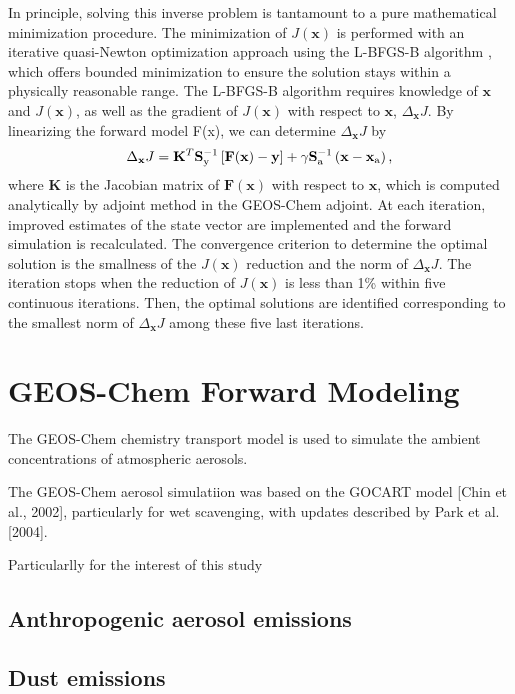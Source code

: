  In principle, solving this inverse problem is tantamount to a pure
 mathematical minimization procedure. The minimization of $J(\mathbf{x})$
 is performed with an iterative quasi-Newton optimization approach
 using the L-BFGS-B algorithm \citep{byrd95,zhu94},
 which offers bounded minimization to ensure the solution stays
 within a physically reasonable range. The L-BFGS-B algorithm
 requires knowledge of $\mathbf{x}$ and $J(\mathbf{x})$,
 as well as the gradient of $J(\mathbf{x})$ with respect to
 $\mathbf{x}$, $\Delta_\mathbf{x}J$. By linearizing the forward model F(x),
 we can determine $\Delta_\mathbf{x}J$ by
 \begin{equation} \label{eq:dcost}
  \Delta_\mathbf{x}J = \mathbf{K}^T \mathbf{S}_\text{y}^{-1} \left[ \mathbf{F(x)-y}\right]
                     + \gamma \mathbf{S}_\text{a}^{-1} \left( \mathbf{x}-\mathbf{x}_\text{a} \right) \mbox{,} 
 \end{equation}
 where $\mathbf{K}$ is the Jacobian matrix of $\mathbf{F(x)}$
 with respect to $\mathbf{x}$, which is computed analytically by adjoint method
 in the GEOS-Chem adjoint. At each iteration, improved estimates
 of the state vector are implemented and the forward simulation is recalculated.
 The convergence criterion to determine the optimal solution is the smallness
 of the $J(\mathbf{x})$ reduction and the norm of $\Delta_\mathbf{x}J$.
 The iteration stops when the reduction of $J(\mathbf{x})$ is less than 1\% within
 five continuous iterations. Then, the optimal solutions are identified
 corresponding to the smallest norm of $\Delta_\mathbf{x}J$ among
 these five last iterations.

\section{GEOS-Chem Forward Modeling}

 The GEOS-Chem chemistry transport model is used to simulate the ambient concentrations 
 of atmospheric aerosols.

 The GEOS-Chem aerosol simulatiion was based on the GOCART model [Chin et al., 2002], 
 particularly for wet scavenging, with updates described by Park et al. [2004]. 

 Particularlly for the interest of this study
 \subsection{Anthropogenic aerosol emissions} 
 
 \subsection{Dust emissions}

